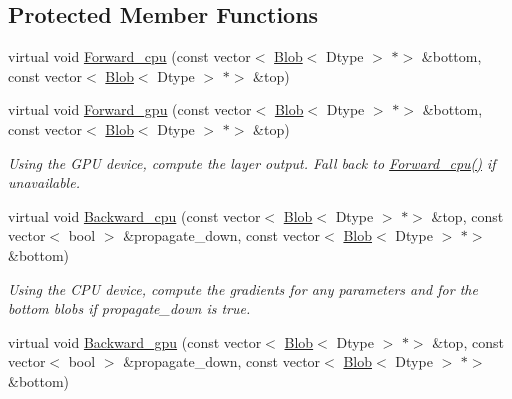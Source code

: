\subsection*{Protected Member Functions}
\begin{DoxyCompactItemize}
\item 
virtual void \mbox{\hyperlink{classcaffe_1_1_dropout_layer_af3d3f94306230950edf514e0fbb8f710}{Forward\+\_\+cpu}} (const vector$<$ \mbox{\hyperlink{classcaffe_1_1_blob}{Blob}}$<$ Dtype $>$ $\ast$$>$ \&bottom, const vector$<$ \mbox{\hyperlink{classcaffe_1_1_blob}{Blob}}$<$ Dtype $>$ $\ast$$>$ \&top)
\item 
\mbox{\label{classcaffe_1_1_dropout_layer_aec676b1d329ed969ea71b32d595e6201}} 
virtual void \mbox{\hyperlink{classcaffe_1_1_dropout_layer_aec676b1d329ed969ea71b32d595e6201}{Forward\+\_\+gpu}} (const vector$<$ \mbox{\hyperlink{classcaffe_1_1_blob}{Blob}}$<$ Dtype $>$ $\ast$$>$ \&bottom, const vector$<$ \mbox{\hyperlink{classcaffe_1_1_blob}{Blob}}$<$ Dtype $>$ $\ast$$>$ \&top)
\begin{DoxyCompactList}\small\item\em Using the G\+PU device, compute the layer output. Fall back to \mbox{\hyperlink{classcaffe_1_1_dropout_layer_af3d3f94306230950edf514e0fbb8f710}{Forward\+\_\+cpu()}} if unavailable. \end{DoxyCompactList}\item 
\mbox{\label{classcaffe_1_1_dropout_layer_afd94f3c55768f4847956c01bce88f9c1}} 
virtual void \mbox{\hyperlink{classcaffe_1_1_dropout_layer_afd94f3c55768f4847956c01bce88f9c1}{Backward\+\_\+cpu}} (const vector$<$ \mbox{\hyperlink{classcaffe_1_1_blob}{Blob}}$<$ Dtype $>$ $\ast$$>$ \&top, const vector$<$ bool $>$ \&propagate\+\_\+down, const vector$<$ \mbox{\hyperlink{classcaffe_1_1_blob}{Blob}}$<$ Dtype $>$ $\ast$$>$ \&bottom)
\begin{DoxyCompactList}\small\item\em Using the C\+PU device, compute the gradients for any parameters and for the bottom blobs if propagate\+\_\+down is true. \end{DoxyCompactList}\item 
\mbox{\label{classcaffe_1_1_dropout_layer_a018a322f4e9e2604d9d55d9c85512600}} 
virtual void \mbox{\hyperlink{classcaffe_1_1_dropout_layer_a018a322f4e9e2604d9d55d9c85512600}{Backward\+\_\+gpu}} (const vector$<$ \mbox{\hyperlink{classcaffe_1_1_blob}{Blob}}$<$ Dtype $>$ $\ast$$>$ \&top, const vector$<$ bool $>$ \&propagate\+\_\+down, const vector$<$ \mbox{\hyperlink{classcaffe_1_1_blob}{Blob}}$<$ Dtype $>$ $\ast$$>$ \&bottom)

\end{DoxyCompactItemize}
